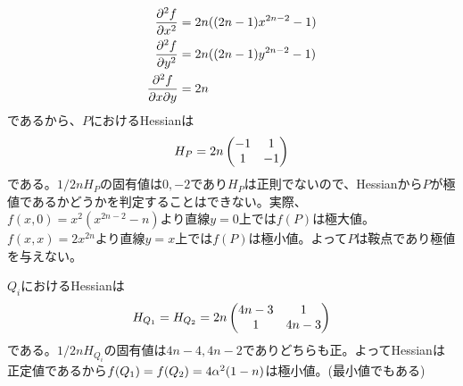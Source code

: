 \begin{sol}
\begin{description}
\begin{align*}
\frac{\partial^2 f }{\partial x^2} &= 2n ( (2n-1)x^{2n-2} - 1 ) \\
\frac{\partial^2 f }{\partial y^2} &= 2n ( (2n-1)y^{2n-2} - 1 ) \\
\frac{\partial^2 f }{\partial x \partial y} &= 2n
    \end{align*}
    であるから、$P$におけるHessianは
    \[
    H_P = 2n \begin{pmatrix} -1 & 1 \\ 1 & -1 \end{pmatrix}
    \]
    である。$1/2n H_P$の固有値は$0, -2$であり$H_P$は正則でないので、Hessianから$P$が極値であるかどうかを判定することはできない。実際、$f(x,0)=x^2(x^{2n-2}-n)$より直線$y=0$上では$f(P)$は極大値。$f(x,x) = 2x^{2n}$より直線$y=x$上では$f(P)$は極小値。よって$P$は鞍点であり極値を与えない。

$Q_i$におけるHessianは
\[
H_{Q_1} = H_{Q_2} =  2n \begin{pmatrix} 4n-3 & 1 \\ 1 & 4n-3 \end{pmatrix}
\]
である。$1/2n H_{Q_i}$の固有値は$4n-4, 4n-2$でありどちらも正。よってHessianは正定値であるから$f(Q_1)=f(Q_2) = 4{\alpha}^2 (1-n)$は極小値。(最小値でもある)
  \end{description}
\end{sol}
